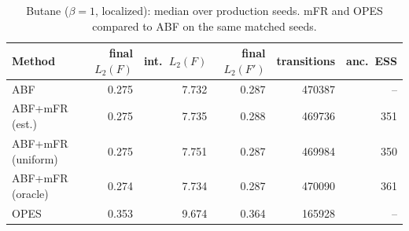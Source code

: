 \begin{table}[t]\centering\small
\caption{Butane ($\beta{=}1$, localized): median over production seeds. mFR and OPES compared to ABF on the same matched seeds.}\label{tab:alk_butane_main}
\begin{tabular}{lrrrrr}\toprule
Method & final $L_2(F)$ & int.\ $L_2(F)$ & final $L_2(F')$ & transitions & anc.\ ESS \\\midrule
ABF & 0.275 & 7.732 & 0.287 & 470387 & -- \\
ABF+mFR (est.) & 0.275 & 7.735 & 0.288 & 469736 & 351 \\
ABF+mFR (uniform) & 0.275 & 7.751 & 0.287 & 469984 & 350 \\
ABF+mFR (oracle) & 0.274 & 7.734 & 0.287 & 470090 & 361 \\
OPES & 0.353 & 9.674 & 0.364 & 165928 & -- \\
\bottomrule\end{tabular}\end{table}
